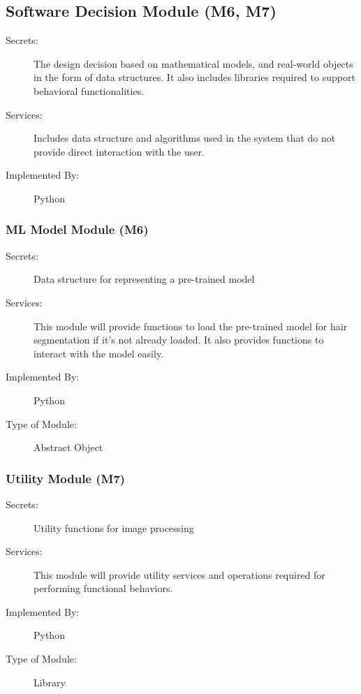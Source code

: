 \documentclass[12pt, titlepage]{article}
\begin{document}
\subsection{Software Decision Module (M6, M7)}

\begin{description}
\item[Secrets:] The design decision based on mathematical models, and real-world objects in the form of data structures. It also includes libraries required to support behavioral functionalities.
\item[Services:] Includes data structure and algorithms used in the system that
  do not provide direct interaction with the user. 

\item[Implemented By:] Python
\end{description}

\subsubsection{ML Model Module (M6)}

\begin{description}
\item[Secrets:]Data structure for representing a pre-trained model
\item[Services:]  This module will provide functions to load the pre-trained model for hair segmentation if it's not already loaded. It also provides functions to interact with the model easily.
\item[Implemented By:] Python
\item[Type of Module:] Abstract Object
\end{description}

\subsubsection{Utility Module (M7)}

\begin{description}
\item[Secrets:]Utility functions for image processing
\item[Services:] This module will provide utility services and operations required for performing functional behaviors.
\item[Implemented By:] Python
\item[Type of Module:] Library
\end{description}
\end{document}
